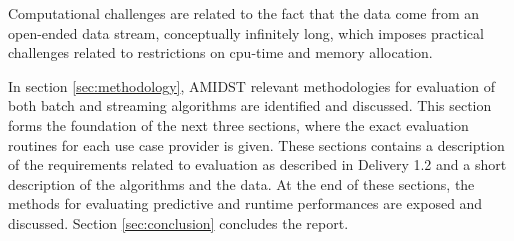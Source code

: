 Computational challenges are related to the fact that the data come from an open-ended data stream, conceptually infinitely long, which imposes practical challenges related to restrictions on cpu-time and memory allocation.  


In section \ref{sec:methodology}, AMIDST relevant methodologies for evaluation of both batch and streaming algorithms are identified and discussed.  This section forms the foundation of the next three sections, where the exact evaluation routines for each use case provider is given. These sections contains a description of the requirements related to evaluation as described in Delivery 1.2 and a short description of the algorithms and the data.  At the end of these sections, the methods for evaluating predictive and runtime performances are exposed and discussed.  Section \ref{sec:conclusion} concludes the report.

%



%
%
